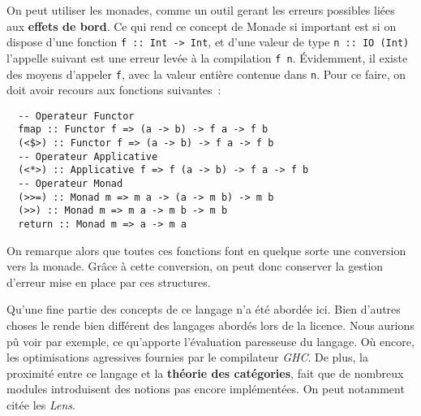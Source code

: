 On peut utiliser les monades, comme un outil gerant les erreurs possibles 
liées aux \textbf{effets de bord}. Ce qui rend ce concept de Monade si 
important est si on dispose d'une fonction 
\texttt{f :: Int -> Int}, et d'une valeur de type 
\texttt{n :: IO (Int)} l'appelle suivant est une erreur levée à la 
compilation \texttt{f n}. Évidemment, il existe des moyens 
d'appeler \texttt{f}, avec la valeur entière contenue dans 
\texttt{n}. Pour ce faire, on doit avoir recours aux fonctions 
suivantes~: 

\begin{verbatim}
  -- Operateur Functor
  fmap :: Functor f => (a -> b) -> f a -> f b
  (<$>) :: Functor f => (a -> b) -> f a -> f b
  -- Operateur Applicative
  (<*>) :: Applicative f => f (a -> b) -> f a -> f b
  -- Operateur Monad
  (>>=) :: Monad m => m a -> (a -> m b) -> m b
  (>>) :: Monad m => m a -> m b -> m b
  return :: Monad m => a -> m a
\end{verbatim}

On remarque alors que toutes ces fonctions font en quelque sorte une conversion 
vers la monade. Grâce à cette conversion, on peut donc conserver la gestion 
d'erreur mise en place par ces structures.

Qu'une fine partie des concepts de ce langage n'a été abordée ici. Bien d'autres
choses le rende bien différent des langages abordés lors de la licence. Nous 
aurions pû voir par exemple, ce qu'apporte l'évaluation paresseuse du langage. 
Où encore, les optimisations agressives fournies par le compilateur 
\textit{GHC}. De plus, la proximité entre ce langage et la 
\textbf{théorie des catégories}, fait que de nombreux modules introduisent des 
notions pas encore implémentées. On peut notamment citée les \textit{Lens}.